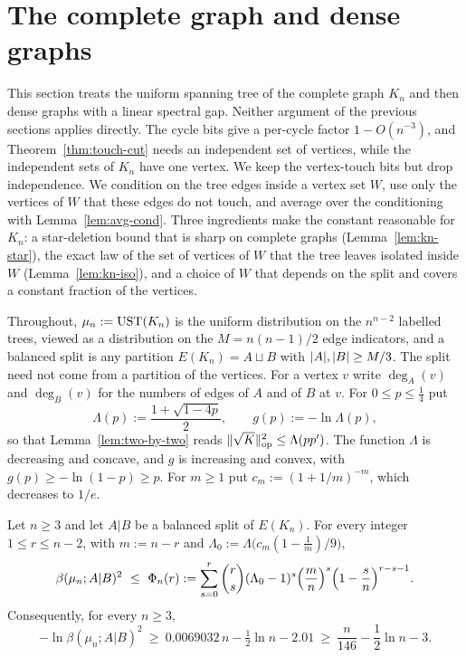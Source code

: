 \section{The complete graph and dense graphs}\label{sec:complete}

This section treats the uniform spanning tree of the complete graph $K_n$ and then dense graphs with a linear spectral gap. Neither argument of the previous sections applies directly. The cycle bits give a per-cycle factor $1-O(n^{-3})$, and Theorem~\ref{thm:touch-cut} needs an independent set of vertices, while the independent sets of $K_n$ have one vertex. We keep the vertex-touch bits but drop independence. We condition on the tree edges inside a vertex set $W$, use only the vertices of $W$ that these edges do not touch, and average over the conditioning with Lemma~\ref{lem:avg-cond}. Three ingredients make the constant reasonable for $K_n$: a star-deletion bound that is sharp on complete graphs (Lemma~\ref{lem:kn-star}), the exact law of the set of vertices of $W$ that the tree leaves isolated inside $W$ (Lemma~\ref{lem:kn-iso}), and a choice of $W$ that depends on the split and covers a constant fraction of the vertices.

Throughout, $\mu_n:=\mathrm{UST}(K_n)$ is the uniform distribution on the $n^{n-2}$ labelled trees, viewed as a distribution on the $M=n(n-1)/2$ edge indicators, and a balanced split is any partition $E(K_n)=A\sqcup B$ with $\lvert A\rvert,\lvert B\rvert\ge M/3$. The split need not come from a partition of the vertices. For a vertex $v$ write $\deg_A(v)$ and $\deg_B(v)$ for the numbers of edges of $A$ and of $B$ at $v$. For $0\le p\le\frac14$ put
\[
  \Lambda(p):=\frac{1+\sqrt{1-4p}}2,\qquad g(p):=-\ln\Lambda(p),
\]
so that Lemma~\ref{lem:two-by-two} reads $\lVert \sqrt K\rVert_{\mathrm{op}}^2\le\Lambda(pp')$. The function $\Lambda$ is decreasing and concave, and $g$ is increasing and convex, with $g(p)\ge-\ln(1-p)\ge p$. For $m\ge1$ put $c_m:=(1+1/m)^{-m}$, which decreases to $1/e$.

\begin{theorem}\label{thm:complete}
Let $n\ge3$ and let $A|B$ be a balanced split of $E(K_n)$. For every integer $1\le r\le n-2$, with $m:=n-r$ and $\Lambda_0:=\Lambda\bigl(c_m(1-\frac1m)/9\bigr)$,
\[
  \beta(\mu_n;A|B)^2\ \le\ \Phi_n(r):=\sum_{s=0}^{r}\binom rs(\Lambda_0-1)^s\Bigl(\frac mn\Bigr)^s\Bigl(1-\frac sn\Bigr)^{r-s-1} .
\]
Consequently, for every $n\ge3$,
\[
  -\ln\beta(\mu_n;A|B)^2\ \ge\ 0.0069032\,n-\tfrac12\ln n-2.01\ \ge\ \frac n{146}-\frac12\ln n-3 .
\]
\end{theorem}

